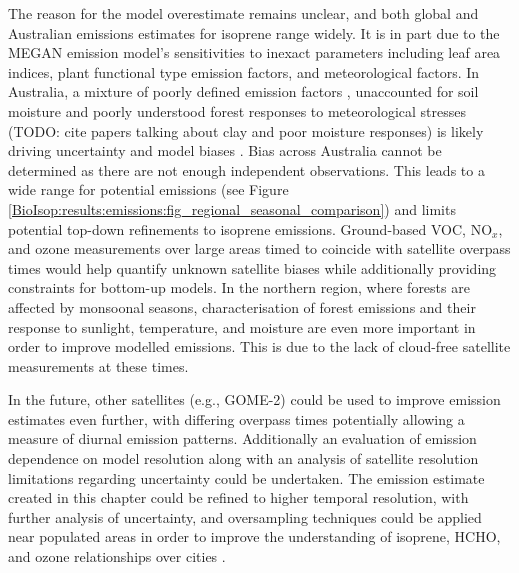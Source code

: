   The reason for the model overestimate remains unclear, and both global and Australian emissions estimates for isoprene range widely.
  It is in part due to the MEGAN emission model's sensitivities to inexact parameters including leaf area indices, plant functional type emission factors, and meteorological factors. 
  In Australia, a mixture of poorly defined emission factors \parencite[e.g.,][]{Emmerson2016}, unaccounted for soil moisture \parencite[e.g.,][]{Sindelarova2014, Emmerson2019} and poorly understood forest responses to meteorological stresses (TODO: cite papers talking about clay and poor moisture responses) is likely driving uncertainty and model biases \parencite{Emmerson2019}.
  Bias across Australia cannot be determined as there are not enough independent observations.
  This leads to a wide range for potential emissions (see Figure \ref{BioIsop:results:emissions:fig_regional_seasonal_comparison}) and limits potential top-down refinements to isoprene emissions.
  Ground-based VOC, NO$_x$, and ozone measurements over large areas timed to coincide with satellite overpass times would help quantify unknown satellite biases while additionally providing constraints for bottom-up models.
  In the northern region, where forests are affected by monsoonal seasons, characterisation of forest emissions and their response to sunlight, temperature, and moisture are even more important in order to improve modelled emissions.
  This is due to the lack of cloud-free satellite measurements at these times.
  
  In the future, other satellites (e.g., GOME-2) could be used to improve emission estimates even further, with differing overpass times potentially allowing a measure of diurnal emission patterns.
  Additionally an evaluation of emission dependence on model resolution along with an analysis of satellite resolution limitations regarding uncertainty could be undertaken.
  The emission estimate created in this chapter could be refined to higher temporal resolution, with further analysis of uncertainty, and oversampling techniques could be applied near populated areas in order to improve the understanding of isoprene, HCHO, and ozone relationships over cities \parencite[e.g.,][]{Surl2018}.

